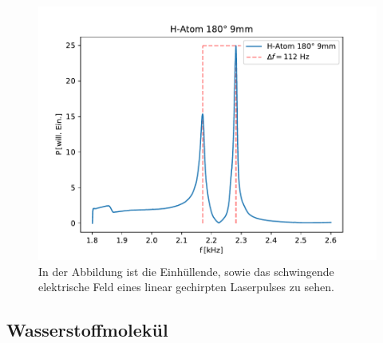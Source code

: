             \begin{figure}[ht]
                \centering
                \includegraphics[scale=0.5]{./pictures/hatom_180_9mm.pdf}
                \caption{In der Abbildung ist die Einhüllende, sowie das schwingende elektrische Feld eines linear gechirpten Laserpulses zu sehen.}
                \label{fig:hatom_180_9mm}
            \end{figure}

    \subsection{Wasserstoffmolekül}
